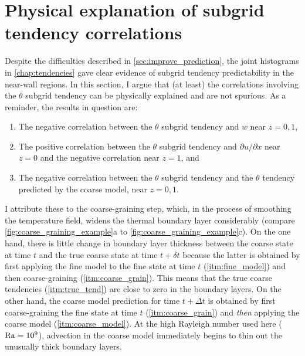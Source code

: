 \documentclass[../main.tex]{subfiles}
\begin{document}
\section{Physical explanation of subgrid tendency correlations}
\label{sec:tendency_explanation}
Despite the difficulties described in \cref{sec:improve_prediction}, the joint
histograms in \cref{chap:tendencies} gave clear evidence of subgrid tendency
predictability in the near-wall regions. In this section, I argue that
(at least) the correlations involving the $\theta$ subgrid tendency can
be physically explained and are not spurious. As a reminder, the results in
question are:
\begin{enumerate}
    \item The negative correlation between the $\theta$ subgrid tendency and
        $w$ near $z=0,1$,
    \item The positive correlation between the $\theta$ subgrid tendency and
        $\partial u/\partial x$ near $z=0$ and the negative correlation near
        $z=1$, and
    \item The negative correlation between the $\theta$ subgrid tendency and
        the $\theta$ tendency predicted by the coarse model, near $z=0,1$.
\end{enumerate}

I attribute these to the coarse-graining step, which, in the process of
smoothing the temperature field, widens the thermal boundary layer considerably
(compare \cref{fig:coarse_graining_example}a to
\cref{fig:coarse_graining_example}c). On the one hand, there is little change
in boundary layer thickness between the coarse state at time $t$ and the true
coarse state at time $t + \delta t$ because the latter is obtained by first
applying the fine model to the fine state at time $t$ (\cref{itm:fine_model})
and then coarse-graining (\cref{itm:coarse_grain}). This means that the true
coarse tendencies (\cref{itm:true_tend}) are close to zero in the boundary
layers. On the other hand, the coarse model prediction for time $t + \Delta t$
is obtained by first coarse-graining the fine state at time $t$
(\cref{itm:coarse_grain}) and \emph{then} applying the coarse model
(\cref{itm:coarse_model}). At the high Rayleigh number used here ($\mathrm{Ra} =
10^9$), advection in the coarse model immediately begins to thin out the
unusually thick boundary layers.
\end{document}
